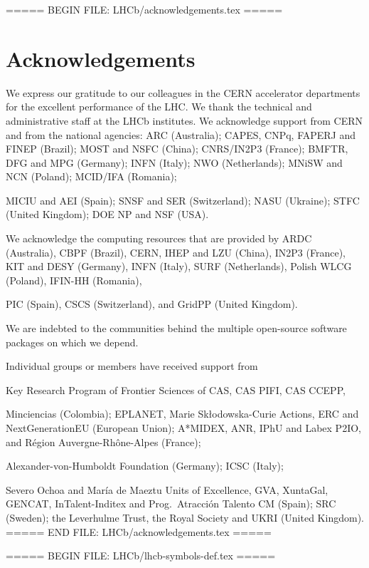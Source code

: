 ===== BEGIN FILE: LHCb/acknowledgements.tex =====
\section*{Acknowledgements}



\noindent We express our gratitude to our colleagues in the CERN
accelerator departments for the excellent performance of the LHC. We
thank the technical and administrative staff at the LHCb
institutes.
We acknowledge support from CERN and from the national agencies:
ARC (Australia);
CAPES, CNPq, FAPERJ and FINEP (Brazil);
MOST and NSFC (China);
CNRS/IN2P3 (France);
BMFTR, DFG and MPG (Germany);
INFN (Italy);
NWO (Netherlands);
MNiSW and NCN (Poland);
MCID/IFA (Romania);

MICIU and AEI (Spain);
SNSF and SER (Switzerland);
NASU (Ukraine);
STFC (United Kingdom);
DOE NP and NSF (USA).

We acknowledge the computing resources that are provided by ARDC (Australia),
CBPF (Brazil),
CERN,
IHEP and LZU (China),
IN2P3 (France),
KIT and DESY (Germany),
INFN (Italy),
SURF (Netherlands),
Polish WLCG (Poland),
IFIN-HH (Romania),

PIC (Spain), CSCS (Switzerland),
and GridPP (United Kingdom).

We are indebted to the communities behind the multiple open-source
software packages on which we depend.

Individual groups or members have received support from

Key Research Program of Frontier Sciences of CAS, CAS PIFI, CAS CCEPP,


Minciencias (Colombia);
EPLANET, Marie Sk\l{}odowska-Curie Actions, ERC and NextGenerationEU (European Union);
A*MIDEX, ANR, IPhU and Labex P2IO, and R\'{e}gion Auvergne-Rh\^{o}ne-Alpes (France);

Alexander-von-Humboldt Foundation (Germany);
ICSC (Italy);

Severo Ochoa and Mar\'ia de Maeztu Units of Excellence, GVA, XuntaGal, GENCAT, InTalent-Inditex and Prog.~Atracci\'on Talento CM (Spain);
SRC (Sweden);
the Leverhulme Trust, the Royal Society and UKRI (United Kingdom).
===== END FILE: LHCb/acknowledgements.tex =====

===== BEGIN FILE: LHCb/lhcb-symbols-def.tex =====























